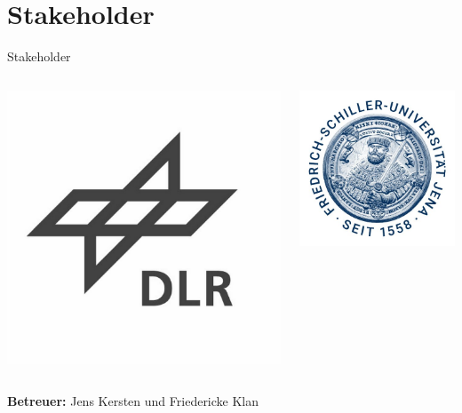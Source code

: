 \documentclass[12pt, xcolor={usenames,dvipsnames,svgnames,x11names,table}]{beamer}
\begin{document}
	\section{Stakeholder}
	\begin{frame}{Stakeholder}{}
		\begin{columns}
			\begin{column}{.5\textwidth}
				\center \includegraphics[width=.9\textwidth]{dlr}
			\end{column}
			\begin{column}{.5\textwidth}
				\center \includegraphics[width=.8\textwidth]{fsu}
			\end{column}
		\end{columns}\bigskip
		\textbf{Betreuer:} Jens Kersten und Friedericke Klan
	\end{frame}
	
\end{document}
